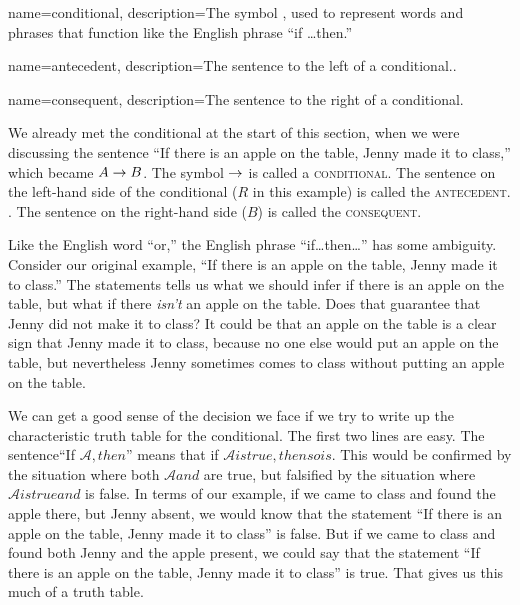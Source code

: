 {
name=conditional,
description={The symbol \onlyif, used to represent words and phrases that function like the English phrase ``if \ldots then.''}
}

{
name=antecedent,
description={The sentence to the left of a conditional..}
}

{
name=consequent,
description={The sentence to the right of a conditional.}
}

We already met the conditional at the start of this section, when we were discussing the sentence ``If there is an apple on the table, Jenny made it to class,'' which became $A \mathrel{\rightarrow} B$. The symbol $\mathrel{\rightarrow}$ is called a \textsc{\gls{conditional}}. \label{def:conditional} The sentence on the left-hand side of the conditional ($R$ in this example) is called the \textsc{\gls{antecedent}}. \label{def:antecedent}.  The sentence on the right-hand side ($B$) is called the \textsc{\gls{consequent}}. \label{def:consequent}

Like the English word ``or,'' the English phrase ``if\ldots then\ldots'' has some ambiguity. Consider our original example, ``If there is an apple on the table, Jenny made it to class.'' The statements tells us what we should infer if there is an apple on the table, but what if there \emph{isn't} an apple on the table. Does that guarantee that Jenny did not make it to class? It could be that an apple on the table is a clear sign that Jenny made it to class, because no one else would put an apple on the table, but nevertheless Jenny sometimes comes to class without putting an apple on the table.

We can get a good sense of the decision we face if we try to write up the characteristic truth table for the conditional. The first two lines are easy. The sentence``If $\mathcal{A}, then $'' means that if $\mathcal{A} is true, then so is $. This would be confirmed by the situation where both $\mathcal{A} and $ are true, but falsified by the situation where $\mathcal{A} is true and $ is false. In terms of our example, if we came to class and found the apple there, but Jenny absent, we would know that the statement ``If there is an apple on the table, Jenny made it to class'' is false. But if we came to class and found both Jenny and the apple present, we could say that the statement ``If there is an apple on the table, Jenny made it to class'' is true. That gives us this much of a truth table.


